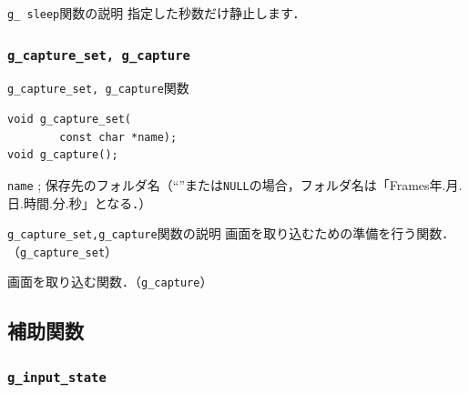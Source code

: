 \documentclass[a4paper,12pt]{jsarticle}%
\begin{document}
\begin{itembox}[l]{\texttt{g\_ sleep}関数の説明}
指定した秒数だけ静止します．
\end{itembox}




\clearpage
\subsubsection{\texttt{g\_capture\_set, g\_capture}}

\begin{itembox}[l]{\texttt{g\_capture\_set, g\_capture}関数}
\begin{verbatim}
void g_capture_set(
        const char *name);
void g_capture();
\end{verbatim}
\verb|name| ; 保存先のフォルダ名（``''または\verb|NULL|の場合，フォルダ名は「Frames年.月.日.時間.分.秒」となる．）\\
\end{itembox}

\begin{itembox}[l]{\texttt{g\_capture\_set,g\_capture}関数の説明}
画面を取り込むための準備を行う関数．（\verb|g_capture_set|）

画面を取り込む関数．（\verb|g_capture|）
\end{itembox}


\clearpage
\subsection{補助関数}

\subsubsection{\texttt{g\_input\_state}}
\end{document}
